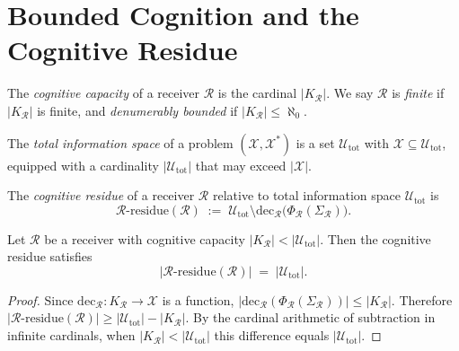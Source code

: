 \section{Bounded Cognition and the Cognitive Residue}
\label{sec:ch13-cognition}

\begin{definition}\label{def:cog-cap-mono}
The \emph{cognitive capacity} of a receiver $\mathcal{R}$ is the cardinal
$|K_{\mathcal{R}}|$.  We say $\mathcal{R}$ is \emph{finite} if
$|K_{\mathcal{R}}|$ is finite, and \emph{denumerably bounded} if
$|K_{\mathcal{R}}| \leq \aleph_0$.
\end{definition}

\begin{definition}\label{def:total-info-mono}
The \emph{total information space} of a problem $(\mathcal{X}, \mathcal{X}^{*})$
is a set $\mathcal{U}_{\mathrm{tot}}$ with
$\mathcal{X} \subseteq \mathcal{U}_{\mathrm{tot}}$, equipped with a cardinality
$|\mathcal{U}_{\mathrm{tot}}|$ that may exceed $|\mathcal{X}|$.
\end{definition}

\begin{definition}\label{def:residue-mono}
The \emph{cognitive residue} of a receiver $\mathcal{R}$ relative to total
information space $\mathcal{U}_{\mathrm{tot}}$ is
\[
  \mathcal{R}\text{-residue}(\mathcal{R})
  \;:=\; \mathcal{U}_{\mathrm{tot}} \setminus
    \mathrm{dec}_{\mathcal{R}}\!\bigl(
      \Phi_{\mathcal{R}}(\Sigma_{\mathcal{R}})\bigr).
\]
\end{definition}

\begin{theorem}\label{thm:residue-mono}
Let $\mathcal{R}$ be a receiver with cognitive capacity
$|K_{\mathcal{R}}| < |\mathcal{U}_{\mathrm{tot}}|$.  Then the cognitive
residue satisfies
\[
  |\mathcal{R}\text{-residue}(\mathcal{R})|
  \;=\; |\mathcal{U}_{\mathrm{tot}}|.
\]
\end{theorem}

\begin{proof}
Since $\mathrm{dec}_{\mathcal{R}} : K_{\mathcal{R}} \to \mathcal{X}$ is a
function,
$|\mathrm{dec}_{\mathcal{R}}(\Phi_{\mathcal{R}}(\Sigma_{\mathcal{R}}))| \leq
|K_{\mathcal{R}}|$.
Therefore
$|\mathcal{R}\text{-residue}(\mathcal{R})| \geq
|\mathcal{U}_{\mathrm{tot}}| - |K_{\mathcal{R}}|$.
By the cardinal arithmetic of subtraction in infinite cardinals, when
$|K_{\mathcal{R}}| < |\mathcal{U}_{\mathrm{tot}}|$ this difference equals
$|\mathcal{U}_{\mathrm{tot}}|$.
\end{proof}

